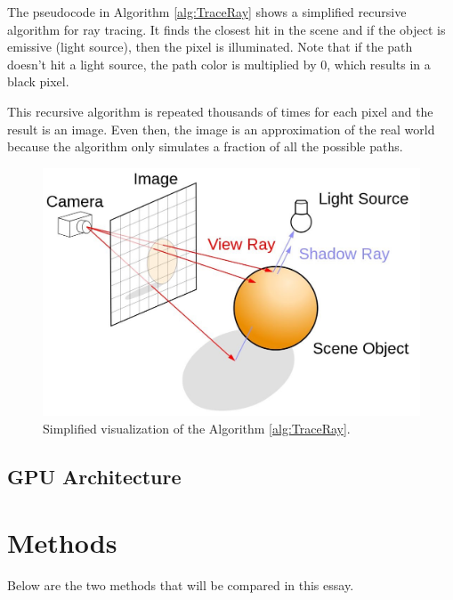 \documentclass[12pt]{article}
\begin{document}
The pseudocode in Algorithm \ref{alg:TraceRay} shows a simplified recursive algorithm for ray tracing.
It finds the closest hit in the scene and if the object is emissive (light source), then the pixel is illuminated.
Note that if the path doesn't hit a light source, the path color is multiplied by 0, which results in a black pixel.

This recursive algorithm is repeated thousands of times for each pixel and the result is an image.
Even then, the image is an approximation of the real world because the algorithm only simulates a fraction of all the possible paths.

\begin{figure}[h]
    \begin{center}
        \includegraphics[scale=0.22]{RayTracingImage}
    \end{center}
    \caption{Simplified visualization of the Algorithm \ref{alg:TraceRay}. \parencite{NVIDIA:Raytracing}}
    \label{fig:RayTracingImage}
\end{figure}

\subsection{GPU Architecture}


\section{Methods}

Below are the two methods that will be compared in this essay.
\end{document}

